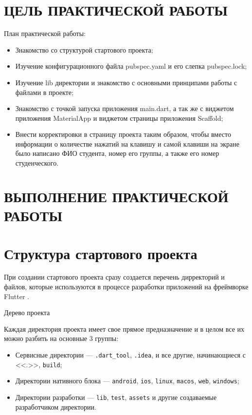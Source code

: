 \section*{ЦЕЛЬ ПРАКТИЧЕСКОЙ РАБОТЫ}

План практической работы:
\begin{itemize}
	\item Знакомство со структурой стартового проекта;
	\item Изучение конфигурационного файла pubspec.yaml
		и его слепка pubspec.lock;
	\item Изучение lib директории и знакомство
		с основными принципами работы с файлами в проекте;
	\item Знакомство с точкой запуска приложения main.dart,
		а так же с виджетом приложения MaterialApp
		и виджетом страницы приложения Scaffold;
	\item Внести корректировки в страницу проекта таким образом,
		чтобы вместо информации о количестве нажатий на клавишу
		и самой клавиши на экране было написано ФИО студента,
		номер его группы, а также его номер студенческого.
\end{itemize}

\clearpage

\section*{ВЫПОЛНЕНИЕ ПРАКТИЧЕСКОЙ РАБОТЫ}

\section{Структура стартового проекта}

При создании стартового проекта сразу создается перечень дирректорий
и файлов, которые используются в процессе разработки приложений
на фреймворке Flutter .

\begin{image}
	\caption{Дерево проекта}
	\label{fig:tree:project}
\end{image}

Каждая директория проекта имеет свое прямое предназначение
и в целом все их можно разбить на основные 3 группы:

\begin{itemize}
	\item Сервисные директории --- \texttt{.dart\_tool}, \texttt{.idea},
		и все другие, начинающиеся с <<.>>, \texttt{build};
	\item Директории нативного блока --- \texttt{android}, \texttt{ios},
		\texttt{linux}, \texttt{macos}, \texttt{web}, \texttt{windows};
	\item Директории разработки --- \texttt{lib}, \texttt{test},
		\texttt{assets} и другие создаваемые разработчиком директории.
\end{itemize}

